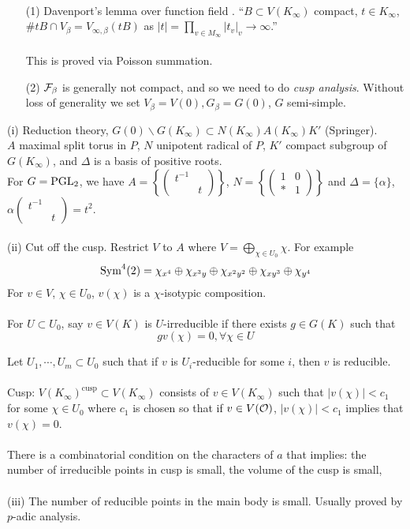 \documentclass[12pt,amsfont]{amsart}
\begin{document}
\begin{itemize}
\begin{pbm}
{\ }
\begin{enumerate}
\item[(1)] Davenport's lemma over function field . ``$B \subset V(K_\infty)$ compact, $t \in K_\infty$, $\# tB \cap V_\beta = V_{\infty, \beta}(tB)$ as $|t| = \displaystyle \prod_{v \in M_\infty} |t_v|_v \rightarrow \infty$.'' \\ \\
This is proved via Poisson summation. \\
\item[(2)] $\mathcal{F}_\beta$ is generally not compact, and so we need to do \emph{cusp analysis}. Without loss of generality we set $V_\beta = V(0), G_\beta = G(0)$, $G$ semi-simple. 
\end{enumerate}
(i) Reduction theory, $G(0) \backslash G(K_\infty) \subset N(K_\infty) A(K_\infty) K'$ (Springer). \\ 
$A$ maximal split torus in $P$, $N$ unipotent radical of $P$, $K'$ compact subgroup of $G(K_\infty)$, and $\Delta$ is a basis of positive roots. \\
For $G = \operatorname{PGL}_2$, we have $A = \left \{\begin{pmatrix} t^{-1} & \\ & t \end{pmatrix} \right \}$, $N = \left \{\begin{pmatrix} 1 & 0 \\ \ast & 1 \end{pmatrix} \right \}$ and $\Delta = \{\alpha\}$, $\alpha \begin{pmatrix} t^{-1} & \\ & t \end{pmatrix} = t^2$. \\ \\
(ii) Cut off the cusp. Restrict $V$ to $A$ where $V = \displaystyle \bigoplus_{\chi \in U_0} \chi$. For example 
\[\operatorname{Sym}^4(2) = \chi_{x^4} \oplus \chi_{x^3 y} \oplus \chi_{x^2 y^2} \oplus \chi_{xy^3} \oplus \chi_{y^4} \]
For $v \in V$, $\chi \in U_0$, $v(\chi)$ is a $\chi$-isotypic composition. \\ \\
For $U \subset U_0$, say $v \in V(K)$ is $U$-irreducible if there exists $g \in G(K)$ such that
\[gv(\chi) = 0, \forall \chi \in U\]

Let $U_1, \cdots, U_m \subset U_0$ such that if $v$ is $U_i$-reducible for some $i$, then $v$ is reducible.  \\ \\
Cusp: $V(K_\infty)^{\text{cusp}} \subset V(K_\infty)$ consists of $v \in V(K_\infty)$ such that $|v(\chi)| < c_1$ for some $\chi \in U_0$ where $c_1$ is chosen so that if $v \in V(\mathcal{O})$, $|v(\chi)| < c_1$ implies that $v(\chi) = 0$. \\ \\
There is a combinatorial condition on the characters of $a$ that implies: the number of irreducible points in cusp is small, the volume of the cusp is small, \\ \\
(iii) The number of reducible points in the main body is small. Usually proved by $p$-adic analysis. 


\end{pbm}
\end{itemize}
\end{document}
